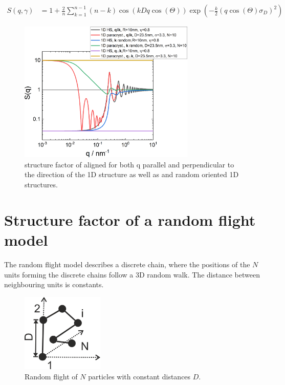 \begin{align}\label{eq:SQ1D_paracrystal}
  S(q,\gamma) &=  1+\frac{2}{n} \sum_{k=1}^{n-1} (n-k)
\cos(kDq\cos(\Theta))
     \exp\left(-\frac{k}{2}\left(q\cos(\Theta) \sigma_D\right)^2\right)
\end{align}

\begin{figure}[htb]
\begin{center}
\includegraphics[width=0.75\textwidth]{../images/structure_factor/SQ_1D_2D/SQ_1D.png}
\end{center}
\caption{structure factor of aligned for both q parallel and perpendicular to the direction of the 1D structure as well as and random oriented 1D structures.}
\label{fig:1DSQ}
\end{figure}

\clearpage
\section{Structure factor of a random flight model} \hspace{1pt}
The random flight model describes a discrete chain, where the positions of the $N$ units forming the discrete chains follow a 3D random walk. The distance between neighbouring units is constants.

\begin{figure}[htb]
\begin{center}
\includegraphics[width=0.35\textwidth]{../images/structure_factor/randomflight3D.png}
\end{center}
\caption{Random flight of $N$ particles with constant distances $D$.}
\label{fig:randomflight3D}
\end{figure}

